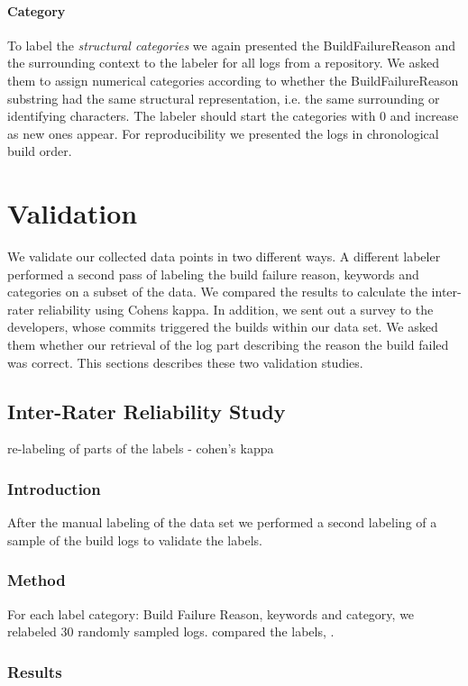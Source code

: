 \documentclass[\myrootdir/main.tex]{subfiles}
\begin{document}
\paragraph{Category}
To label the \emph{structural categories} we again presented the BuildFailureReason and the surrounding context to the labeler for all logs from a repository.
We asked them to assign numerical categories according to whether the BuildFailureReason substring had the same structural representation, i.e. the same surrounding or identifying characters.
The labeler should start the categories with 0 and increase as new ones appear.
For reproducibility we presented the logs in chronological build order.


\section{Validation}
We validate our collected data points in two different ways.
A different labeler performed a second pass of labeling the build failure reason, keywords and categories on a subset of the data.
We compared the results to calculate the inter-rater reliability using Cohens kappa.
In addition, we sent out a survey to the developers, whose commits triggered the builds within our data set.
We asked them whether our retrieval of the log part describing the reason the build failed was correct.
This sections describes these two validation studies.

\subsection{Inter-Rater Reliability Study}
re-labeling of parts of the labels - cohen's kappa
\subsubsection{Introduction}
After the manual labeling of the data set we performed a second labeling of a sample of the build logs to validate the labels.
\subsubsection{Method}
For each label category: Build Failure Reason, keywords and category, we relabeled 30 randomly sampled logs.
compared the labels, .
\subsubsection{Results}
\end{document}
